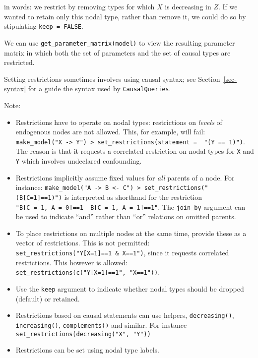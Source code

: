 \documentclass[
  11pt,
  article]{jss}
\providecommand{\tightlist}{%
  \setlength{\itemsep}{0pt}\setlength{\parskip}{0pt}}\usepackage{longtable,booktabs,array}
\begin{document}
in words: we restrict by removing types for which \(X\) is decreasing in
\(Z\). If we wanted to retain only this nodal type, rather than remove
it, we could do so by stipulating \texttt{keep\ =\ FALSE}.

\begin{table}

\end{table}

We can use \texttt{get\_parameter\_matrix(model)} to view the resulting
parameter matrix in which both the set of parameters and the set of
causal types are restricted.

Setting restrictions sometimes involves using causal syntax; see
Section~\ref{sec-syntax} for a guide the syntax used by
\texttt{CausalQueries}.

Note:

\begin{itemize}
\tightlist
\item
  Restrictions have to operate on nodal types: restrictions on
  \emph{levels} of endogenous nodes are not allowed. This, for example,
  will fail:
  \texttt{make\_model("X\ -\textgreater{}\ Y")\ \textbar{}\textgreater{}\ set\_restrictions(statement\ =\ \ "(Y\ ==\ 1)")}.
  The reason is that it requests a correlated restriction on nodal types
  for \texttt{X} and \texttt{Y} which involves undeclared confounding.
\item
  Restrictions implicitly assume fixed values for \emph{all} parents of
  a node. For instance:
  \texttt{make\_model("A\ -\textgreater{}\ B\ \textless{}-\ C")\ \textbar{}\textgreater{}\ set\_restrictions("(B{[}C=1{]}==1)")}
  is interpreted as shorthand for the restriction
  \texttt{"B{[}C\ =\ 1,\ A\ =\ 0{]}==1\ \textbar{}\ B{[}C\ =\ 1,\ A\ =\ 1{]}==1"}.
  The \texttt{join\_by} argument can be used to indicate ``and'' rather
  than ``or'' relations on omitted parents.
\item
  To place restrictions on multiple nodes at the same time, provide
  these as a vector of restrictions. This is not permitted:
  \texttt{set\_restrictions("Y{[}X=1{]}==1\ \&\ X==1")}, since it
  requests correlated restrictions. This however is allowed:
  \texttt{set\_restrictions(c("Y{[}X=1{]}==1",\ "X==1"))}.
\item
  Use the \texttt{keep} argument to indicate whether nodal types should
  be dropped (default) or retained.
\item
  Restrictions based on causal statements can use helpers,
  \texttt{decreasing()}, \texttt{increasing()}, \texttt{complements()}
  and similar. For instance
  \texttt{set\_restrictions(decreasing("X",\ "Y"))}
\item
  Restrictions can be set using nodal type labels.
\end{itemize}
\end{document}
